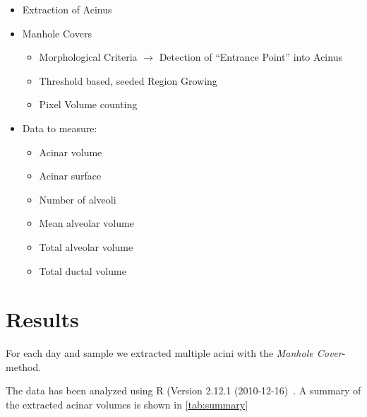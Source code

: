 \documentclass[%
	paper=a4,%
	twoside=true,%
	draft=false,%
	abstract=false]{scrartcl}
\begin{document}
\begin{itemize}
	\item Extraction of Acinus
	\item Manhole Covers
	\begin{itemize}
		\item Morphological Criteria $\rightarrow$ Detection of ``Entrance Point'' into Acinus
		\item Threshold based, seeded Region Growing
		\item Pixel Volume counting
	\end{itemize}
	\item Data to measure:
	\begin{itemize}
		\item Acinar volume
		\item Acinar surface
		\item Number of alveoli
		\item Mean alveolar volume
		\item Total alveolar volume
		\item Total ductal volume
	\end{itemize}
\end{itemize}

\section{Results}\label{sec:Results}
For each day and sample we extracted multiple acini with the \emph{Manhole Cover}-method.

The data has been analyzed using R (Version 2.12.1 (2010-12-16)~\cite{R}. A summary of the extracted acinar volumes is shown in \autoref{tab:summary}
\end{document}
